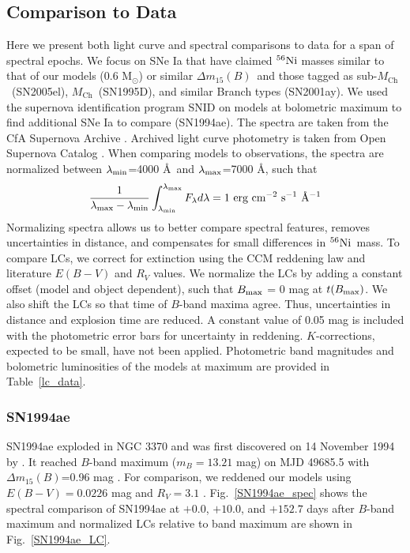 \documentclass[useAMS,usenatbib,useasmath]{mnras}
\newcommand{\Mch}{\hbox{$M_{\text{Ch}}$}}
\newcommand{\Msun}{\hbox{M$_\odot$}}
\newcommand{\elem}[2][default]{$^{#1}{\rm #2}$}
\def\isoni{$^{56}{\rm Ni}$}
\newcommand{\delm}{$\Delta m_{15}(B)$}
\def\fig{Fig.}
\begin{document}
\subsection{Comparison to Data}%
\label{section_data_compare}
Here we present both light curve and spectral comparisons to data for a span of spectral epochs. We focus on SNe Ia that have claimed \elem[56]{Ni} masses similar to that of our models (0.6 \Msun) or similar \delm\ and those tagged as sub-\Mch\ (SN2005el), \Mch\ (SN1995D), and similar Branch types (SN2001ay). We used the supernova identification program SNID \citep{Blondin2007} on models at bolometric maximum to find additional SNe Ia to compare (SN1994ae). The spectra are taken from the CfA Supernova Archive \citep{Blondin2012}. Archived light curve photometry is taken from Open Supernova Catalog \citep{Guillochon2017}. When comparing models to observations, the spectra are normalized between $\lambda_{\rm min}$=4000 \AA\ and $\lambda_{\rm max}$=7000 \AA, such that
\begin{equation}\label{normalize}
	\frac{1}{\lambda_{\rm max}-\lambda_{\rm min}}\int^{\lambda_{\rm max}}_{\lambda_{\rm min}}F_\lambda d\lambda=1 \text{ erg cm$^{-2}$ s$^{-1}$ \AA$^{-1}$}
\end{equation}
Normalizing spectra allows us to better compare spectral features, removes uncertainties in distance, and compensates for small differences in \isoni\ mass. To compare LCs, we correct for extinction using the CCM reddening law \citep{CCM1989} and literature $E(B-V)$ and $R_V$ values. We normalize the LCs by adding a constant offset (model and object dependent), such that $B_{\rm max}$ = 0 mag at $t(B_{\rm max})$. We also shift the LCs so that time of $B$-band maxima agree. Thus, uncertainties in distance and explosion time are reduced. A constant value of 0.05 mag is included with the photometric error bars for uncertainty in reddening. $K$-corrections, expected to be small, have not been applied.  Photometric band magnitudes and bolometric luminosities of the models at maximum are provided in Table~\ref{lc_data}.

\subsubsection{SN1994ae}%
\label{SN1994ae}
SN1994ae exploded in NGC 3370 \citep[$z=0.0043$ --][]{Riess1999CFA1,Jha2007} and was first discovered on 14 November 1994 by \cite{vanDyk1994}. It reached $B$-band maximum ($m_B=13.21$ mag) on MJD 49685.5 with  \delm=0.96 mag \citep{Riess1999CFA1,Jha2007}. For comparison, we reddened our models using $E(B-V)=0.0226$ mag and $R_V=3.1$ \citep{Jha2007}. \fig~\ref{SN1994ae_spec} shows the spectral comparison of SN1994ae at $+0.0$, $+10.0$, and $+152.7$ days after $B$-band maximum and normalized LCs relative to band maximum are shown in \fig~\ref{SN1994ae_LC}.
\end{document}
